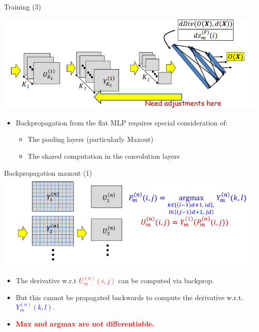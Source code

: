 \documentclass[serif, aspectratio=169]{beamer}
\begin{document}
	\begin{frame}{Training (3)}
		
		\centering
		\includegraphics[keepaspectratio, scale=0.6]{pic/training2.png}
		\smallskip
		
		\begin{itemize}
				\item Backpropagation from the flat MLP requires special consideration of:
				\begin{itemize}
					\item The pooling layers (particularly Maxout)
					\item The shared computation in the convolution layers
				\end{itemize}
			
			
		\end{itemize}
		
		
	\end{frame}
	\begin{frame}{Backpropagation maxout (1)}
		\centering
		\includegraphics[keepaspectratio, scale=0.6]{pic/training3.png}
		\smallskip
		
		\begin{itemize}
			\item The derivative w.r.t \textcolor{red}{\( U^{(n)}_m (i,j) \)} can be computed via backprop.
			\item But this cannot be propagated backwards to compute the derivative w.r.t. \textcolor{blue}{\( Y^{(n)}_m (k,l) \)}.
			\item \textcolor{red}{\textbf{Max and argmax are not differentiable.}}
		\end{itemize}
		
	\end{frame}
\end{document}
